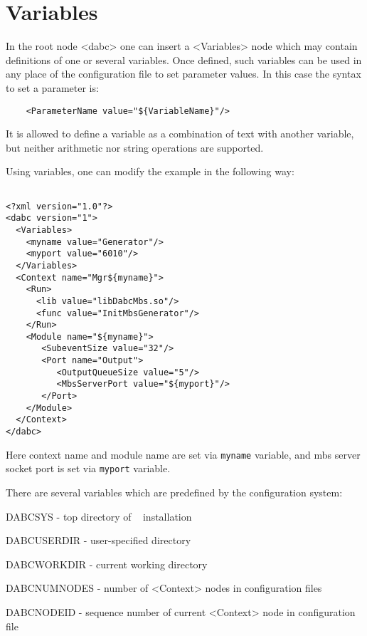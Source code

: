 \section{Variables}
\label{prog_setup_configfile_variables}
In the root node <dabc> one can insert a <Variables> node which may contain 
definitions of one or several variables. Once defined, 
such variables can be used in any place of the configuration file to set parameter values.
In this case the syntax to set a parameter is:

\begin{verbatim}
    <ParameterName value="${VariableName}"/>
\end{verbatim}

It is allowed to define a variable as a combination of text with another variable, 
but neither arithmetic nor string operations are supported. 

Using variables, one can modify the example in the following way:

\begin{small}
\begin{verbatim}

<?xml version="1.0"?>
<dabc version="1">
  <Variables>
    <myname value="Generator"/> 
    <myport value="6010"/> 
  </Variables>
  <Context name="Mgr${myname}">
    <Run>
      <lib value="libDabcMbs.so"/>
      <func value="InitMbsGenerator"/>
    </Run>
    <Module name="${myname}">
       <SubeventSize value="32"/>
       <Port name="Output">
          <OutputQueueSize value="5"/>
          <MbsServerPort value="${myport}"/>
       </Port>
    </Module>
  </Context>
</dabc>
\end{verbatim}
\end{small}

Here context name and module name are set via {\tt myname} variable,
and mbs server socket port is set via {\tt myport} variable.

There are several variables which are predefined by the configuration system:

\bbul
\item DABCSYS - top directory of \dabc~ installation
\item DABCUSERDIR - user-specified directory
\item DABCWORKDIR - current working directory
\item DABCNUMNODES - number of <Context> nodes in configuration files
\item DABCNODEID - sequence number of current <Context> node in configuration file 
\ebul


